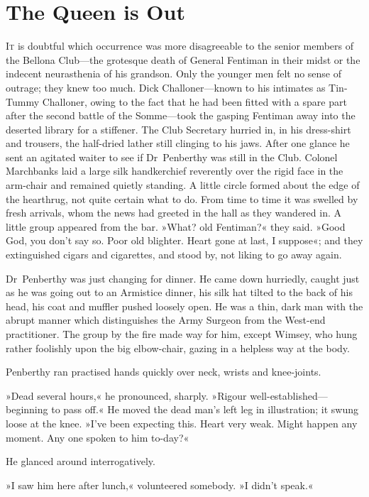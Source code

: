 \chapter{The Queen is Out}
\lettrine[lines=4]{I}{t} is doubtful which occurrence was more disagreeable to the senior members of the Bellona Club—the grotesque death of General Fentiman in their midst or the indecent neurasthenia of his grandson. Only the younger men felt no sense of outrage; they knew too much. Dick Challoner—known to his intimates as Tin-Tummy Challoner, owing to the fact that he had been fitted with a spare part after the second battle of the Somme—took the gasping Fentiman away into the deserted library for a stiffener. The Club Secretary hurried in, in his dress-shirt and trousers, the half-dried lather still clinging to his jaws. After one glance he sent an agitated waiter to see if Dr~Penberthy was still in the Club. Colonel Marchbanks laid a large silk handkerchief reverently over the rigid face in the arm-chair and remained quietly standing. A little circle formed about the edge of the hearthrug, not quite certain what to do. From time to time it was swelled by fresh arrivals, whom the news had greeted in the hall as they wandered in. A little group appeared from the bar. »What? old Fentiman?« they said. »Good God, you don't say so. Poor old blighter. Heart gone at last, I suppose«; and they extinguished cigars and cigarettes, and stood by, not liking to go away again.

Dr~Penberthy was just changing for dinner. He came down hurriedly, caught just as he was going out to an Armistice dinner, his silk hat tilted to the back of his head, his coat and muffler pushed loosely open. He was a thin, dark man with the abrupt manner which distinguishes the Army Surgeon from the West-end practitioner. The group by the fire made way for him, except Wimsey, who hung rather foolishly upon the big elbow-chair, gazing in a helpless way at the body.

Penberthy ran practised hands quickly over neck, wrists and knee-joints.

»Dead several hours,« he pronounced, sharply. »Rigour well-established—beginning to pass off.« He moved the dead man's left leg in illustration; it swung loose at the knee. »I've been expecting this. Heart very weak. Might happen any moment. Any one spoken to him to-day?«

He glanced around interrogatively.

»I saw him here after lunch,« volunteered somebody. »I didn't speak.«

